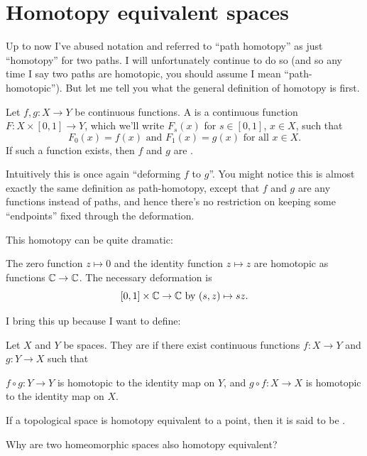 \section{Homotopy equivalent spaces}
Up to now I've abused notation and referred to ``path homotopy'' as just ``homotopy'' for two paths.
I will unfortunately continue to do so (and so any time I say two paths are homotopic, you should assume I mean ``path-homotopic'').
But let me tell you what the general definition of homotopy is first.
\begin{definition}
	Let $f,g \colon X \to Y$ be continuous functions.
	A  is a continuous function $F \colon X \times [0,1] \to Y$,
	which we'll write $F_s(x)$ for $s \in [0,1]$, $x \in X$, such that
	\[ F_0(x) = f(x) \text{ and } F_1(x) = g(x) \text{ for all $x \in X$.} \]
	If such a function exists, then $f$ and $g$ are .
\end{definition}
Intuitively this is once again ``deforming $f$ to $g$''.
You might notice this is almost exactly the same definition as path-homotopy,
except that $f$ and $g$ are any functions instead of paths, and hence
there's no restriction on keeping some ``endpoints'' fixed through the deformation.

This homotopy can be quite dramatic:
\begin{example}
	The zero function $z \mapsto 0$ and the identity function $z \mapsto z$
	are homotopic as functions $\mathbb C \to \mathbb C$.
	The necessary deformation is
	\[ [0,1] \times \mathbb C \to \mathbb C \text{ by } (s,z) \mapsto sz. \]
\end{example}

I bring this up because I want to define:
\begin{definition}
	\label{def:homotopy_equiv}
	Let $X$ and $Y$ be spaces.
	They are  if there exist
	continuous functions $f \colon X \to Y$ and $g \colon Y \to X$ such that
	\begin{enumerate}[(i)]
		\ii $f \circ g \colon Y \to Y$ is homotopic to the identity map on $Y$, and
		\ii $g \circ f \colon X \to X$ is homotopic to the identity map on $X$.
	\end{enumerate}
	If a topological space is homotopy equivalent to a point,
	then it is said to be .
\end{definition}
\begin{ques}
	Why are two homeomorphic spaces also homotopy equivalent?
\end{ques}

